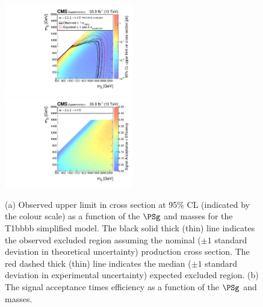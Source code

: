 \begin{figure}
    \begin{center}
            \includegraphics[width=0.50\textwidth]{Supplementary/T1bbbbXSEC}
            \includegraphics[width=0.50\textwidth]{Supplementary/T1bbbb_efficiency_aux}
        \caption{ (a) Observed upper limit in cross section at 95\% CL (indicated
        by the colour scale) as a function of 
        the $\PSg$ and \PSGczDo %
        masses for the 
        T1bbbb %
        simplified  model.  The  black  solid thick  (thin)  line indicates  the
        observed  excluded  region  assuming   the  nominal  (${\pm}1$  standard
        deviation in theoretical uncertainty)  production cross section. The red
        dashed  thick  (thin)  line  indicates  the  median  (${\pm}1$  standard
        deviation in experimental uncertainty) expected excluded region.
        (b) The signal acceptance times efficiency as a function of 
        the $\PSg$ and \PSGczDo %
        masses.
        }
        \label{fig:T1bbbb}
    \end{center}
\end{figure}

